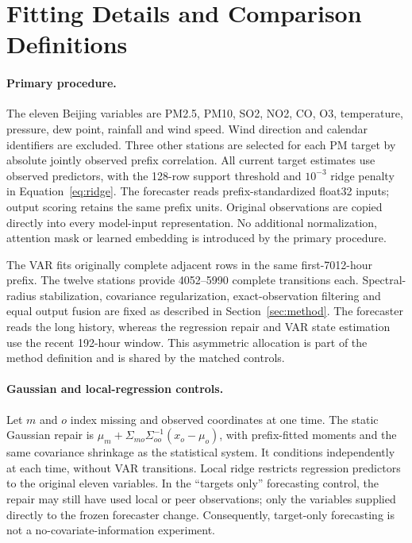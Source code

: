 \section{Fitting Details and Comparison Definitions}
\label{app:training}

\paragraph{Primary procedure.}
The eleven Beijing variables are PM2.5, PM10, SO2, NO2, CO, O3, temperature, pressure, dew point, rainfall and wind speed. Wind direction and calendar identifiers are excluded. Three other stations are selected for each PM target by absolute jointly observed prefix correlation. All current target estimates use observed predictors, with the 128-row support threshold and $10^{-3}$ ridge penalty in Equation~\ref{eq:ridge}. The forecaster reads prefix-standardized float32 inputs; output scoring retains the same prefix units. Original observations are copied directly into every model-input representation. No additional normalization, attention mask or learned embedding is introduced by the primary procedure.

The VAR fits originally complete adjacent rows in the same first-7012-hour prefix. The twelve stations provide 4052--5990 complete transitions each. Spectral-radius stabilization, covariance regularization, exact-observation filtering and equal output fusion are fixed as described in Section~\ref{sec:method}. The forecaster reads the long history, whereas the regression repair and VAR state estimation use the recent 192-hour window. This asymmetric allocation is part of the method definition and is shared by the matched controls.

\paragraph{Gaussian and local-regression controls.}
Let $m$ and $o$ index missing and observed coordinates at one time. The static Gaussian repair is $\mu_m+\Sigma_{mo}\Sigma_{oo}^{-1}(x_o-\mu_o)$, with prefix-fitted moments and the same covariance shrinkage as the statistical system. It conditions independently at each time, without VAR transitions. Local ridge restricts regression predictors to the original eleven variables. In the ``targets only'' forecasting control, the repair may still have used local or peer observations; only the variables supplied directly to the frozen forecaster change. Consequently, target-only forecasting is not a no-covariate-information experiment.

